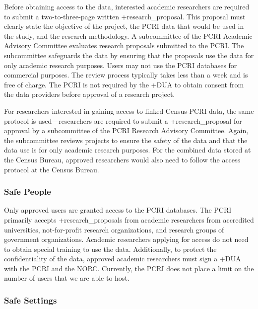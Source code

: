\documentclass[
]{WileySix}
\begin{document}
Before obtaining access to the data, interested academic researchers are required to submit a two-to-three-page written +research\_proposal\textbar. This proposal must clearly state the objective of the project, the PCRI data that would be used in the study, and the research methodology. A subcommittee of the PCRI Academic Advisory Committee evaluates research proposals submitted to the PCRI. The subcommittee safeguards the data by ensuring that the proposals use the data for only academic research purposes. Users may not use the PCRI databases for commercial purposes. The review process typically takes less than a week and is free of charge. The PCRI is not required by the +DUA\textbar{} to obtain consent from the data providers before approval of a research project.

For researchers interested in gaining access to linked Census-PCRI data, the same protocol is used---researchers are required to submit a +research\_proposal\textbar{} for approval by a subcommittee of the PCRI Research Advisory Committee. Again, the subcommittee reviews projects to ensure the safety of the data and that the data use is for only academic research purposes. For the combined data stored at the Census Bureau, approved researchers would also need to follow the access protocol at the Census Bureau.

\hypertarget{safe-people-3}{%
\subsubsection{Safe People}\label{safe-people-3}}

Only approved users are granted access to the PCRI databases. The PCRI primarily accepts +research\_proposals\textbar{} from academic researchers from accredited universities, not-for-profit research organizations, and research groups of government organizations. Academic researchers applying for access do not need to obtain special training to use the data. Additionally, to protect the confidentiality of the data, approved academic researchers must sign a +DUA\textbar{} with the PCRI and the NORC. Currently, the PCRI does not place a limit on the number of users that we are able to host.

\hypertarget{safe-settings-3}{%
\subsubsection{Safe Settings}\label{safe-settings-3}}
\end{document}
